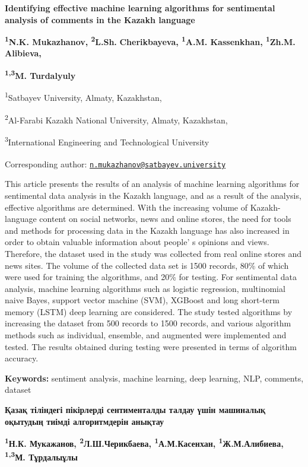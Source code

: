 
{\bfseries Identifying effective machine learning algorithms for
sentimental analysis of comments in the Kazakh language}

{\bfseries \textsuperscript{1}N.K. Mukazhanov\textsuperscript{\envelope },
\textsuperscript{2}L.Sh.} {\bfseries Cherikbayeva, \textsuperscript{1}A.M.
Kassenkhan, \textsuperscript{1}Zh.M. Alibieva,}

{\bfseries \textsuperscript{1,3}M. Turdalyuly}

\textsuperscript{1}Satbayev University, Almaty, Kazakhstan,

\textsuperscript{2}Al-Farabi Kazakh National University, Almaty,
Kazakhstan,

\textsuperscript{3}International Engineering and Technological
University

{\bfseries \textsuperscript{\envelope }}Corresponding author:
\href{mailto:n.mukazhanov@satbayev.university}{\nolinkurl{n.mukazhanov@satbayev.university}}

This article presents the results of an analysis of machine learning
algorithms for sentimental data analysis in the Kazakh language, and as
a result of the analysis, effective algorithms are determined. With the
increasing volume of Kazakh-language content on social networks, news
and online stores, the need for tools and methods for processing data in
the Kazakh language has also increased in order to obtain valuable
information about people' s opinions and views.
Therefore, the dataset used in the study was collected from real online
stores and news sites. The volume of the collected data set is 1500
records, 80\% of which were used for training the algorithms, and 20\%
for testing. For sentimental data analysis, machine learning algorithms
such as logistic regression, multinomial naive Bayes, support vector
machine (SVM), XGBoost and long short-term memory (LSTM) deep learning
are considered. The study tested algorithms by increasing the dataset
from 500 records to 1500 records, and various algorithm methods such as
individual, ensemble, and augmented were implemented and tested. The
results obtained during testing were presented in terms of algorithm
accuracy.

{\bfseries Keywords:} sentiment analysis, machine learning, deep learning,
NLP, comments, dataset

{\bfseries Қазақ тіліндегі пікірлерді сентименталды талдау үшін машиналық
оқытудың тиімді алгоритмдерін анықтау}

{\bfseries \textsuperscript{1}Н.К. Мукажанов\textsuperscript{\envelope },
\textsuperscript{2}Л.Ш.Черикбаева, \textsuperscript{1}А.М.Касенхан,
\textsuperscript{1}Ж.М.Алибиева,\\
\textsuperscript{1,3}М. Тұрдалыұлы}

